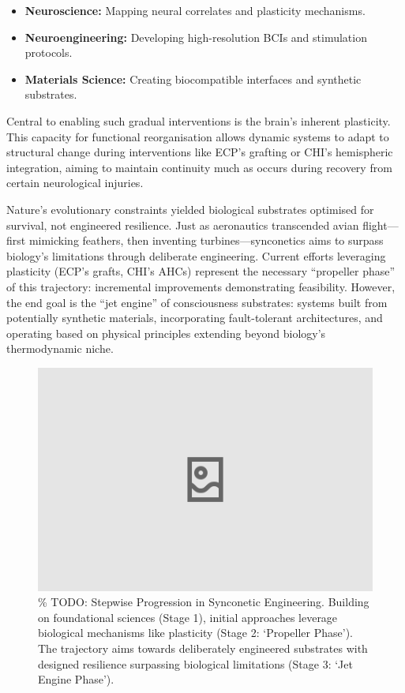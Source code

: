 \documentclass[10pt]{article}
\begin{document}
\begin{sloppypar}
  \begin{itemize}
    \item \textbf{Neuroscience:} Mapping neural correlates and plasticity mechanisms.
    \item \textbf{Neuroengineering:} Developing high-resolution BCIs and stimulation protocols.
    \item \textbf{Materials Science:} Creating biocompatible interfaces and synthetic substrates.
  \end{itemize}

  Central to enabling such gradual interventions is the brain’s inherent plasticity. This capacity for functional reorganisation allows dynamic systems to adapt to structural change during interventions like ECP’s grafting or CHI’s hemispheric integration, aiming to maintain continuity much as occurs during recovery from certain neurological injuries.

  Nature’s evolutionary constraints yielded biological substrates optimised for survival, not engineered resilience. Just as aeronautics transcended avian flight—first mimicking feathers, then inventing turbines—synconetics aims to surpass biology’s limitations through deliberate engineering. Current efforts leveraging plasticity (ECP’s grafts, CHI’s AHCs) represent the necessary “propeller phase” of this trajectory: incremental improvements demonstrating feasibility. However, the end goal is the “jet engine” of consciousness substrates: systems built from potentially synthetic materials, incorporating fault-tolerant architectures, and operating based on physical principles extending beyond biology’s thermodynamic niche.

  \begin{figure}[ht!]
    \centering
    \includegraphics[width=\textwidth]{figures/engineering-progression.png}
    \caption{\% TODO: Stepwise Progression in Synconetic Engineering. Building on foundational sciences (Stage 1), initial approaches leverage biological mechanisms like plasticity (Stage 2: ‘Propeller Phase’). The trajectory aims towards deliberately engineered substrates with designed resilience surpassing biological limitations (Stage 3: ‘Jet Engine Phase’).}
    \label{fig:engineering-progression}
  \end{figure}


\end{sloppypar}
\end{document}
